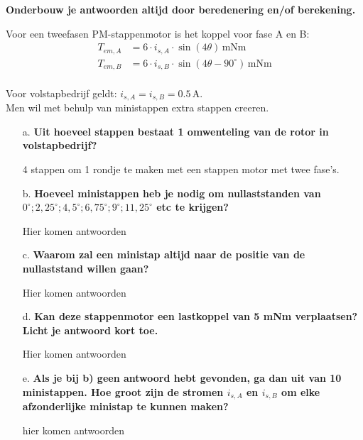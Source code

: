 \textbf{Onderbouw je antwoorden altijd door beredenering en/of berekening.}

Voor een tweefasen PM-stappenmotor is het koppel voor fase A en B:
\begin{align*}
    T_{em,A} &= 6 \cdot i_{s,A} \cdot \sin(4\theta) \, \text{mNm} \\
    T_{em,B} &= 6 \cdot i_{s,B} \cdot \sin(4\theta - 90^\circ) \, \text{mNm}
    \end{align*}\\
Voor volstapbedrijf geldt: \(i_{s,A} = i_{s,B} = 0.5 \, \text{A}\).\\
Men wil met behulp van ministappen extra stappen creeren.    


\begin{enumerate}
    \item [a.] \textbf{Uit hoeveel stappen bestaat 1 omwenteling van de rotor in volstapbedrijf?}
    
        4 stappen om 1 rondje te maken met een stappen motor met twee fase's.

    \item [b.] \textbf{Hoeveel ministappen heb je nodig om nullaststanden van $0^\circ ; 2,25^\circ ; 4,5^\circ ; 6,75^\circ ; 9^\circ ; 11,25^\circ$ etc te krijgen?}
    
        Hier komen antwoorden

    \item [c.] \textbf{Waarom zal een ministap altijd naar de positie van de nullaststand willen
    gaan?}
    
        Hier komen antwoorden


    \item [d.] \textbf{Kan deze stappenmotor een lastkoppel van 5 mNm verplaatsen?
    Licht je antwoord kort toe.}     
    
        Hier komen antwoorden

    \item [e.] \textbf{Als je bij b) geen antwoord hebt gevonden, ga dan uit van 10 ministappen.
    Hoe groot zijn de stromen $i_{s,A}$ en $i_{s,B}$ om elke afzonderlijke ministap te kunnen
    maken?}
    
        hier komen antwoorden

\end{enumerate}